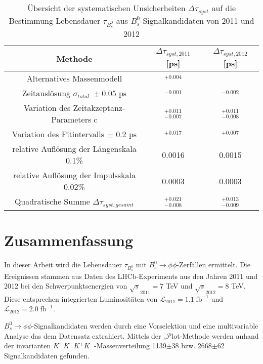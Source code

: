 \documentclass{article}
\begin{document}
\begin{table}[h!]
\noindent\begin{centering}
\begin{tabular}{c|c|c}
Methode & $\Delta\tau_{syst,2011}$ [ps]& $\Delta\tau_{syst,2012}$ [ps]\tabularnewline
\hline 
Alternatives Massenmodell&$^{+0.004}$& \tabularnewline
Zeitauslösung $\sigma_{total}\;\pm$0.05 ps & $_{-0.001}$ & $_{-0.002}$ \tabularnewline
Variation des Zeitakzeptanz-Parameters c& $^{+0.011}_{-0.007}$&$^{+0.011}_{-0.008}$ \tabularnewline
Variation des Fitintervalls $\pm$ 0.2 ps & $^{+0.017} $ & $^{+0.007} $\tabularnewline
relative Auflösung der Längenskala 0.1\% & 0.0016 & 0.0015\tabularnewline
relative Auflösung der Impulsskala 0.02\% & 0.0003 & 0.0003\tabularnewline
\hline \hline
Quadratische Summe $\Delta\tau_{syst,gesamt}$ &  $^{+0.021}_{-0.008}$&$^{+0.013}_{-0.009}$ \tabularnewline

\end{tabular}
\par\end{centering}
\caption{Übersicht der systematischen Unsicherheiten $\Delta\tau_{syst}$ auf die Bestimmung Lebensdauer $\tau_{B_s^0}$ aus $B_s^0$-Signalkandidaten von 2011 und 2012}
\label{table:systemerr}
\end{table}

\vspace{20cm}
\pagebreak[4]

\section{Zusammenfassung}
In dieser Arbeit wird die Lebensdauer $\tau_{B_s^0}$ mit $B_s^0\rightarrow \phi \phi$-Zerfällen ermittelt. Die Ereignissen stammen aus Daten des LHCb-Experiments aus den Jahren 2011 und 2012 bei den Schwerpunktsenergien  von $\sqrt{s}_{2011}=7$ TeV und $\sqrt{s}_{2012}=8$ TeV. Diese entsprechen integrierten Luminositäten von $\mathcal{L}_{2011}= 1.1\;\text{fb}^{-1}$ und $\mathcal{L}_{2012}=2.0\;\text{fb}^{-1}$. 

$B_s^0\rightarrow \phi \phi$-Signalkandidaten werden durch eine Vorselektion und eine multivariable Analyse das dem Datensatz extrahiert. Mittels der $_s\mathcal{P}$lot-Methode werden anhand der invarianten $K^+K^-K^+K^-$-Massenverteilung 1139$\pm$38 bzw. 2668$\pm$62 Signalkandidaten gefunden. 
\end{document}
